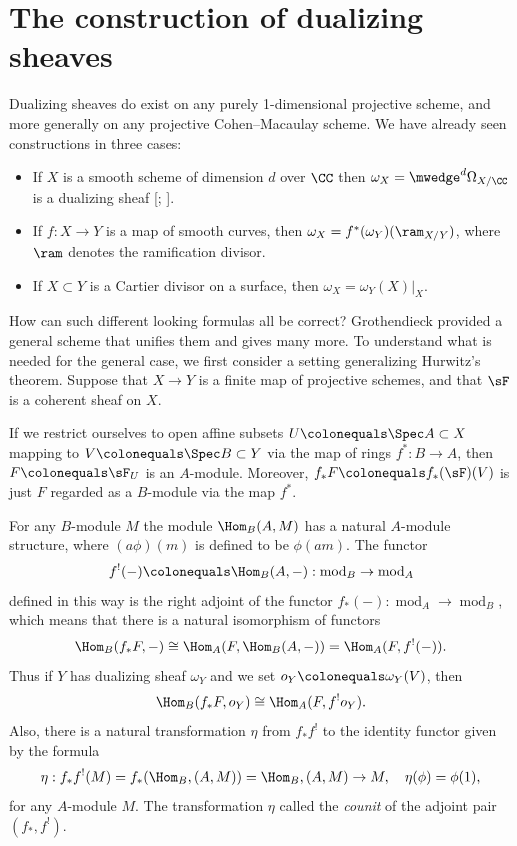 \section{The construction of dualizing sheaves}
\label{dualizing sheaves section}

Dualizing sheaves do exist on any purely 1-dimensional projective scheme, 
and more generally on any projective Cohen--Macaulay scheme. We
have already seen constructions
in three
cases:

\begin{itemize}
\item If $X$ is a smooth scheme of dimension $d$ over $\CC$ then
$\omega_{X}= \mwedge^{d} \Omega_{X/\CC}$
is a dualizing sheaf
%
[;
\citeyear[p.~648, 708]{Griffiths-Harris1978}].
\item If $f: X\to Y$ is a map of smooth curves, then $\omega_{X} =
f^{*}(\omega_{Y})(\ram_{X/Y})$, where
$\ram$ denotes the
ramification divisor.
%
\item If $X\subset Y$ is a
Cartier divisor
%
on a surface, then $\omega_{X}
= \omega_{Y}(X)|_{X}$.
\end{itemize}

How can such different looking formulas all be correct?
Grothendieck
%
provided a general scheme
that unifies them and gives many more.
To understand what is needed for the general case, we first consider a
setting generalizing
Hurwitz's theorem.
%
Suppose that $X\to Y$ is a
finite map
%
of projective schemes, and that
$\sF$ is a coherent sheaf on $X$.

If we restrict ourselves to open affine subsets
$U \colonequals \Spec A\subset X$ mapping to
$V\colonequals \Spec B\subset Y$ via the map of rings $f^{*}:B\to A$, then
%
$F \colonequals \sF_{U}$ is an $A$-module. Moreover,
$f_*{F} \colonequals f_*(\sF)(V)$ is just $F$ regarded as a $B$-module
via the map $f^{*}$.

For any $B$-module $M$ the module $\Hom_{B}(A, M)$ has a natural
$A$-module structure,
where $(a\phi)(m)$ is defined to be $\phi(am)$. The functor
%
$$
f^!(-)\colonequals\Hom_{B}(A,-):\operatorname{mod}_B\to\operatorname{mod}_A
$$
defined in this way is the
%
right adjoint of the functor
$f_{*}(-):\operatorname{mod}_{A}\to \operatorname{mod}_{B}$,
which means that there is a natural isomorphism of functors
%
$$
\Hom_{B}(f_{*}F, -) \cong \Hom_{A}(F, \Hom_{B}(A, -)) = \Hom_{A}(F, f^{!}(-)).
$$
Thus
if $Y$ has dualizing sheaf $\omega_Y$ and we set
$o_Y \colonequals \omega_Y(V)$, then
$$
\Hom_{B}(f_{*}F, o_{Y}) \cong \Hom_{A}(F, f^{!}o_{Y}).
$$
Also, there is a natural transformation $\eta$ from $ f_{*}f^{!}$ to
the identity functor given by the formula
$$
\eta: f_{*}f^{!}(M) = f_{*}(\Hom_{B}, (A,M)) = \Hom_{B}, (A,M) \to M,
\quad\eta(\phi) = \phi(1),
$$
for any $A$-module $M$.
The transformation $\eta$ called the
%
%
\emph{counit} of the adjoint pair
$(f_{*}, f^{!})$.

